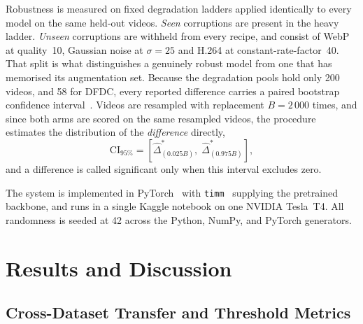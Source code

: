 \documentclass[journal,onecolumn]{IEEEtran}
\newcommand{\dfdc}{DFDC}
\begin{document}
Robustness is measured on fixed degradation ladders applied identically to every
model on the same held-out videos. \emph{Seen} corruptions are present in the
heavy ladder. \emph{Unseen} corruptions are withheld from every recipe, and
consist of WebP at quality~10, Gaussian noise at $\sigma = 25$ and H.264 at
constant-rate-factor~40. That split is what distinguishes a genuinely robust
model from one that has memorised its augmentation set. Because the degradation
pools hold only 200 videos, and 58 for \dfdc{}, every reported difference carries
a paired bootstrap confidence interval~\cite{efron1993bootstrap}. Videos are
resampled with replacement $B = 2\,000$ times, and since both arms are scored on
the same resampled videos, the procedure estimates the distribution of the
\emph{difference} directly,
\begin{equation}
  \mathrm{CI}_{95\%} = \left[
  \hat{\Delta}^{*}_{(0.025B)},\; \hat{\Delta}^{*}_{(0.975B)}
  \right],
  \label{eq:bootstrap}
\end{equation}
and a difference is called significant only when this interval excludes zero.

The system is implemented in PyTorch~\cite{paszke2019pytorch} with
\texttt{timm}~\cite{wightman2019timm} supplying the pretrained
backbone, and runs in a single Kaggle notebook on one NVIDIA Tesla~T4. All
randomness is seeded at 42 across the Python, NumPy, and PyTorch generators.

\section{Results and Discussion}
\label{sec:results}

\subsection{Cross-Dataset Transfer and Threshold Metrics}
\label{ssec:transfer}
\end{document}
